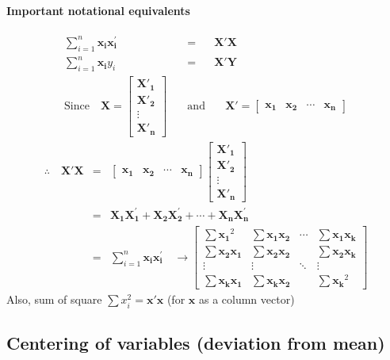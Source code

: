 \paragraph{Important notational equivalents}
\begin{eqnarray*}
\sum^{n}_{i=1} \boldsymbol{x_{i}x_{i}^{'}} &=& \boldsymbol{X'X}\\
\sum^{n}_{i=1} \boldsymbol{x_{i}}y_{i} &=& \boldsymbol{X'Y}\\
\text{Since}\quad\boldsymbol{X}=\begin{bmatrix}
\boldsymbol{X'_1}\\
\boldsymbol{X'_2}\\
\vdots\\
\boldsymbol{X'_n}
\end{bmatrix}\quad&\text{and}&\quad\boldsymbol{X'}=\begin{bmatrix}\boldsymbol{x_{1}}&\boldsymbol{x_{2}}&\cdots&\boldsymbol{x_{n}}\end{bmatrix}
\end{eqnarray*}
\begin{eqnarray*}
\therefore\quad\boldsymbol{X'X}&=&\begin{bmatrix}\boldsymbol{x_{1}}&\boldsymbol{x_{2}}&\cdots&\boldsymbol{x_{n}}\end{bmatrix}
\begin{bmatrix}
\boldsymbol{X'_1}\\
\boldsymbol{X'_2}\\
\vdots\\
\boldsymbol{X'_n}
\end{bmatrix}\\
&=&\boldsymbol{X_{1}X_{1}^{'}}+\boldsymbol{X_{2}X_{2}^{'}}+\cdots+\boldsymbol{X_{n}X_{n}^{'}}\\
&=&\sum^{n}_{i=1}\boldsymbol{x_{i}x_{i}^{'}}\quad\to
\begin{bmatrix}
\sum \boldsymbol{x_{1}}^{2} & \sum\boldsymbol{x_{1}x_{2}} & \cdots & \sum\boldsymbol{x_{1}x_{k}}\\
\sum \boldsymbol{x_{2}x_{1}} & \sum\boldsymbol{x_{2}x_{2}} & & \sum\boldsymbol{x_{2}x_{k}}\\
\vdots & \vdots & \ddots & \vdots\\
\sum \boldsymbol{x_{k}x_{1}} & \sum\boldsymbol{x_{k}x_{2}} & & \sum\boldsymbol{x_{k}}^{2}
\end{bmatrix}
\end{eqnarray*}
Also, sum of square $\sum x_{i}^{2}=\boldsymbol{x'x}$ (for $\boldsymbol{x}$ as a column vector)

\subsection{Centering of variables (deviation from mean)}

